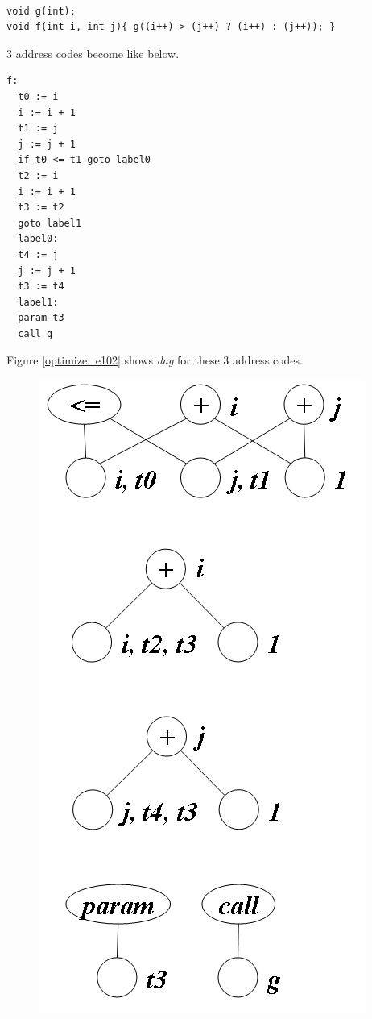 \begin{Example}
\label{optimize_e101}
\begin{verbatim}

void g(int);
void f(int i, int j){ g((i++) > (j++) ? (i++) : (j++)); }
\end{verbatim}
3 address codes become like below.
\begin{verbatim}
f:
  t0 := i
  i := i + 1
  t1 := j
  j := j + 1
  if t0 <= t1 goto label0
  t2 := i
  i := i + 1
  t3 := t2
  goto label1
  label0:
  t4 := j
  j := j + 1
  t3 := t4
  label1:
  param t3
  call g
\end{verbatim}
Figure \ref{optimize_e102} shows {\em dag} for these 3 address codes.
\begin{figure}[htbp]
\begin{center}
\begin{htmlonly}
\includegraphics[width=0.556\linewidth,height=1.1\linewidth]{opt044.png}
\end{htmlonly}
\begin{latexonly}

\end{latexonly}
\end{center}
\end{figure}
\end{Example}

